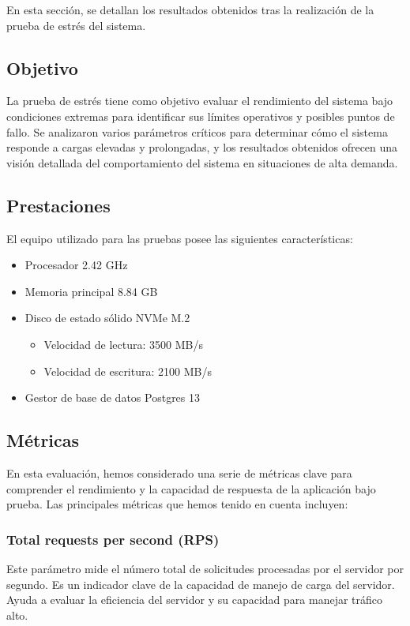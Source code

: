 \documentclass[10pt,times,twocolumn]{article}
\begin{document}
En esta sección, se detallan los resultados obtenidos tras la realización de la prueba de estrés del sistema.

\subsection{Objetivo}

La prueba de estrés tiene como objetivo evaluar el rendimiento del sistema bajo condiciones extremas para identificar sus límites operativos y posibles puntos de fallo. Se analizaron varios parámetros críticos para determinar cómo el sistema responde a cargas elevadas y prolongadas, y los resultados obtenidos ofrecen una visión detallada del comportamiento del sistema en situaciones de alta demanda.

\subsection{Prestaciones}

El equipo utilizado para las pruebas posee las siguientes características:
\begin{itemize}
	\item Procesador 2.42 GHz
	\item Memoria principal 8.84 GB
	\item Disco de estado sólido NVMe M.2
	\begin{itemize}
		\item Velocidad de lectura: 3500 MB/s
		\item Velocidad de escritura: 2100 MB/s
	\end{itemize}
	\item Gestor de base de datos Postgres 13
\end{itemize}

\subsection{Métricas}

En esta evaluación, hemos considerado una serie de métricas clave para comprender el rendimiento y la capacidad de respuesta de la aplicación bajo prueba. Las principales métricas que hemos tenido en cuenta incluyen:

\subsubsection{Total requests per second (RPS)}

Este parámetro mide el número total de solicitudes procesadas por el servidor por segundo. Es un indicador clave de la capacidad de manejo de carga del servidor. Ayuda a evaluar la eficiencia del servidor y su capacidad para manejar tráfico alto.
\end{document}
